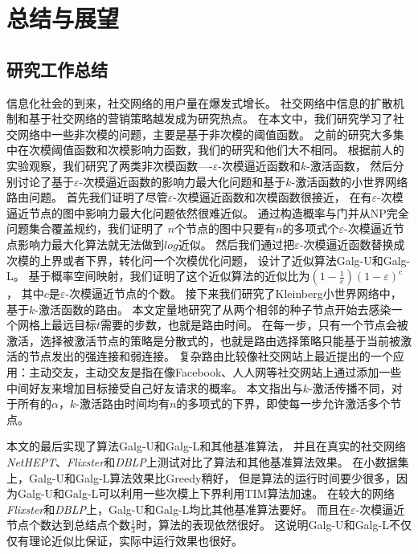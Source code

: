 \chapter{总结与展望}
\section{研究工作总结}
信息化社会的到来，社交网络的用户量在爆发式增长。
社交网络中信息的扩散机制和基于社交网络的营销策略越发成为研究热点。
在本文中，我们研究学习了社交网络中一些非次模的问题，主要是基于非次模的阈值函数。
之前的研究大多集中在次模阈值函数和次模影响力函数，我们的研究和他们大不相同。
根据前人的实验观察，我们研究了两类非次模函数----$\varepsilon$-次模逼近函数和$k$-激活函数，
然后分别讨论了基于$\varepsilon$-次模逼近函数的影响力最大化问题和基于$k$-激活函数的小世界网络路由问题。
首先我们证明了尽管$\varepsilon$-次模逼近函数和次模函数很接近，
在有$\varepsilon$-次模逼近节点的图中影响力最大化问题依然很难近似。
通过构造概率与门并从NP完全问题集合覆盖规约，我们证明了
$n$个节点的图中只要有$n$的多项式个$\varepsilon$-次模逼近节点影响力最大化算法就无法做到$log$近似。
然后我们通过把$\varepsilon$-次模逼近函数替换成次模的上界或者下界，转化问一个次模优化问题，
设计了近似算法\textsf{Galg-U}和\textsf{Galg-L}。
基于概率空间映射，我们证明了这个近似算法的近似比为$(1-\frac{1}{e})(1-\varepsilon)^c$，
其中$c$是$\varepsilon$-次模逼近节点的个数。
接下来我们研究了Kleinberg小世界网络中，基于$k$-激活函数的路由。
本文定量地研究了从两个相邻的种子节点开始去感染一个网格上最远目标$t$需要的步数，也就是路由时间。
在每一步，只有一个节点会被激活，选择被激活节点的策略是分散式的，也就是路由选择策略只能基于当前被激活的节点发出的强连接和弱连接。
复杂路由比较像社交网站上最近提出的一个应用：主动交友，主动交友是指在像Facebook、人人网等社交网站上通过添加一些中间好友来增加目标接受自己好友请求的概率\cite{YangHLC13}。
本文指出与$k$-激活传播不同，对于所有的$\alpha$，$k$-激活路由时间均有$n$的多项式的下界，即使每一步允许激活多个节点。


本文的最后实现了算法\textsf{Galg-U}和\textsf{Galg-L}和其他基准算法，
并且在真实的社交网络{\em NetHEPT}、{\em Flixster}和{\em DBLP}上测试对比了算法和其他基准算法效果。
在小数据集上，\textsf{Galg-U}和\textsf{Galg-L}算法效果比\textsf{Greedy}稍好，
但是算法的运行时间要少很多，因为\textsf{Galg-U}和\textsf{Galg-L}可以利用一些次模上下界利用\textsf{TIM}算法加速。
在较大的网络{\em Flixster}和{\em DBLP}上，\textsf{Galg-U}和\textsf{Galg-L}均比其他基准算法要好。
而且在$\varepsilon$-次模逼近节点个数达到总结点个数$\frac{1}{3}$时，算法的表现依然很好。
这说明\textsf{Galg-U}和\textsf{Galg-L}不仅仅有理论近似比保证，实际中运行效果也很好。




